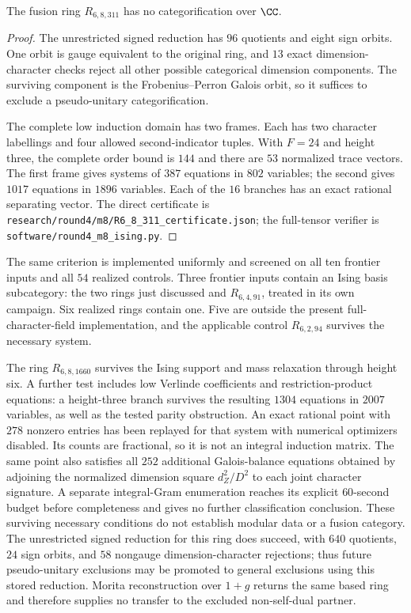 \begin{theorem}
\label{thm:round4-311}
The fusion ring $R_{6,8,311}$ has no categorification over $\CC$.
\end{theorem}
\begin{proof}
The unrestricted signed reduction has $96$ quotients and eight sign
orbits.  One orbit is gauge equivalent to the original ring, and $13$
exact dimension-character checks reject all other possible categorical
dimension components.  The surviving component is the
Frobenius--Perron Galois orbit, so it suffices to exclude a
pseudo-unitary categorification.

The complete low induction domain has two frames.  Each has two
character labellings and four allowed second-indicator tuples.  With
$F=24$ and height three, the complete order bound is $144$ and there are
$53$ normalized trace vectors.  The first frame gives systems of $387$
equations in $802$ variables; the second gives $1017$ equations in
$1896$ variables.  Each of the $16$ branches has an exact rational
separating vector.  The direct certificate is
\texttt{research/round4/m8/R6\_8\_311\_certificate.json}; the
full-tensor verifier is
\texttt{software/round4\_m8\_ising.py}.
\end{proof}

The same criterion is implemented uniformly and screened on all ten
frontier inputs and all $54$ realized controls.  Three frontier inputs
contain an Ising basis subcategory: the two rings just discussed and
$R_{6,4,91}$, treated in its own campaign.  Six realized rings contain
one.  Five are outside the present full-character-field implementation,
and the applicable control $R_{6,2,94}$ survives the necessary system.

The ring $R_{6,8,1660}$ survives the Ising support and mass relaxation
through height six.  A further test includes low Verlinde coefficients
and restriction-product equations: a height-three branch survives the
resulting $1304$ equations in $2007$ variables, as well as the tested
parity obstruction.  An exact rational point with $278$ nonzero entries has been replayed
for that system with numerical optimizers disabled.  Its counts are
fractional, so it is not an integral induction matrix.  The same point
also satisfies all $252$ additional Galois-balance equations obtained by
adjoining the normalized dimension square $d_Z^2/D^2$ to each joint
character signature.  A separate integral-Gram enumeration reaches its
explicit $60$-second budget before completeness and gives no further
classification conclusion.  These surviving
necessary conditions do not establish modular data or a fusion category.  The unrestricted signed
reduction for this ring does succeed, with $640$ quotients, $24$ sign
orbits, and $58$ nongauge dimension-character rejections; thus future
pseudo-unitary exclusions may be promoted to general exclusions using
this stored reduction.  Morita reconstruction over $1+g$ returns the
same based ring and therefore supplies no transfer to the excluded
non-self-dual partner.
